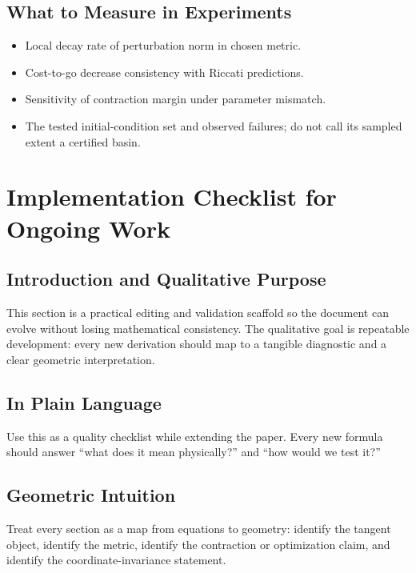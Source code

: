 \documentclass[11pt,letterpaper]{article}
\begin{document}
\subsection{What to Measure in Experiments}
\begin{itemize}
\item Local decay rate of perturbation norm in chosen metric.
\item Cost-to-go decrease consistency with Riccati predictions.
\item Sensitivity of contraction margin under parameter mismatch.
\item The tested initial-condition set and observed failures; do not call its sampled extent a certified basin.
\end{itemize}

\section{Implementation Checklist for Ongoing Work}

\subsection{Introduction and Qualitative Purpose}
This section is a practical editing and validation scaffold so the document can evolve without losing mathematical consistency. The qualitative goal is repeatable development: every new derivation should map to a tangible diagnostic and a clear geometric interpretation.

\subsection{In Plain Language}
Use this as a quality checklist while extending the paper. Every new formula should answer ``what does it mean physically?'' and ``how would we test it?''

\subsection{Geometric Intuition}
Treat every section as a map from equations to geometry: identify the tangent object, identify the metric, identify the contraction or optimization claim, and identify the coordinate-invariance statement.
\end{document}
